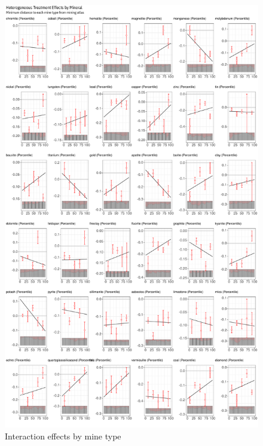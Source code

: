 \documentclass[12pt,reqno]{article}
\begin{document}
\begin{figure}
  \centering
  \includegraphics[]{Output/mining_het_te.pdf}
  \caption{Interaction effects by mine type}
  \label{fig:mine_het_te}
\end{figure}





\end{document}
